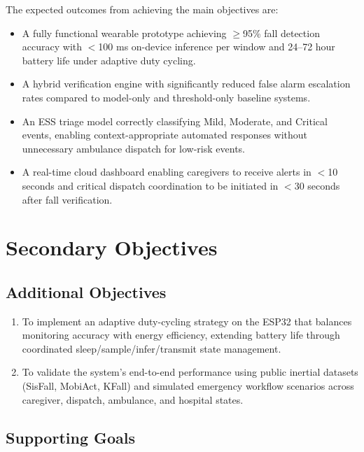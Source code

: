 The expected outcomes from achieving the main objectives are:
\begin{itemize}
\item A fully functional wearable prototype achieving $\geq$95\% fall detection accuracy with $<$100 ms on-device inference per window and 24--72 hour battery life under adaptive duty cycling.
\item A hybrid verification engine with significantly reduced false alarm escalation rates compared to model-only and threshold-only baseline systems.
\item An ESS triage model correctly classifying Mild, Moderate, and Critical events, enabling context-appropriate automated responses without unnecessary ambulance dispatch for low-risk events.
\item A real-time cloud dashboard enabling caregivers to receive alerts in $<$10 seconds and critical dispatch coordination to be initiated in $<$30 seconds after fall verification.
\end{itemize}

\section[Secondary Objectives]{\textbf{Secondary Objectives}}

\subsection{Additional Objectives}

\begin{enumerate}
\item To implement an adaptive duty-cycling strategy on the ESP32 that balances monitoring accuracy with energy efficiency, extending battery life through coordinated sleep/sample/infer/transmit state management.
\item To validate the system's end-to-end performance using public inertial datasets (SisFall, MobiAct, KFall) and simulated emergency workflow scenarios across caregiver, dispatch, ambulance, and hospital states.
\end{enumerate}

\subsection{Supporting Goals}

